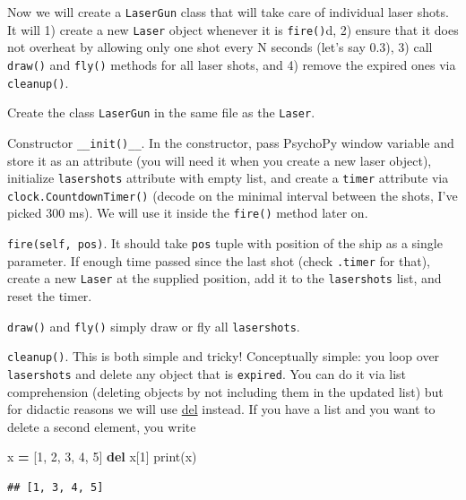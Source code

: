 \documentclass[
]{book}
\newenvironment{Shaded}{\begin{snugshade}}{\end{snugshade}}
\newcommand{\BuiltInTok}[1]{#1}
\newcommand{\DecValTok}[1]{\textcolor[rgb]{0.00,0.00,0.81}{#1}}
\newcommand{\KeywordTok}[1]{\textcolor[rgb]{0.13,0.29,0.53}{\textbf{#1}}}
\newcommand{\NormalTok}[1]{#1}
\newcommand{\OperatorTok}[1]{\textcolor[rgb]{0.81,0.36,0.00}{\textbf{#1}}}
\begin{document}
Now we will create a \texttt{LaserGun} class that will take care of individual laser shots. It will 1) create a new \texttt{Laser} object whenever it is \texttt{fire()}d, 2) ensure that it does not overheat by allowing only one shot every N seconds (let's say 0.3), 3) call \texttt{draw()} and \texttt{fly()} methods for all laser shots, and 4) remove the expired ones via \texttt{cleanup()}.

Create the class \texttt{LaserGun} in the same file as the \texttt{Laser}.

Constructor \texttt{\_\_init()\_\_}. In the constructor, pass PsychoPy window variable and store it as an attribute (you will need it when you create a new laser object), initialize \texttt{lasershots} attribute with empty list, and create a \texttt{timer} attribute via \texttt{clock.CountdownTimer()} (decode on the minimal interval between the shots, I've picked 300 ms). We will use it inside the \texttt{fire()} method later on.

\texttt{fire(self,\ pos)}. It should take \texttt{pos} tuple with position of the ship as a single parameter. If enough time passed since the last shot (check \texttt{.timer} for that), create a new \texttt{Laser} at the supplied position, add it to the \texttt{lasershots} list, and reset the timer.

\texttt{draw()} and \texttt{fly()} simply draw or fly all \texttt{lasershots}.

\texttt{cleanup()}. This is both simple and tricky! Conceptually simple: you loop over \texttt{lasershots} and delete any object that is \texttt{expired}. You can do it via list comprehension (deleting objects by not including them in the updated list) but for didactic reasons we will use \href{https://docs.python.org/3/tutorial/datastructures.html\#the-del-statement}{del} instead. If you have a list and you want to delete a second element, you write

\begin{Shaded}
\begin{Highlighting}[]
\NormalTok{x }\OperatorTok{=}\NormalTok{ [}\DecValTok{1}\NormalTok{, }\DecValTok{2}\NormalTok{, }\DecValTok{3}\NormalTok{, }\DecValTok{4}\NormalTok{, }\DecValTok{5}\NormalTok{]}
\KeywordTok{del}\NormalTok{ x[}\DecValTok{1}\NormalTok{]}
\BuiltInTok{print}\NormalTok{(x)}
\end{Highlighting}
\end{Shaded}

\begin{verbatim}
## [1, 3, 4, 5]
\end{verbatim}
\end{document}

